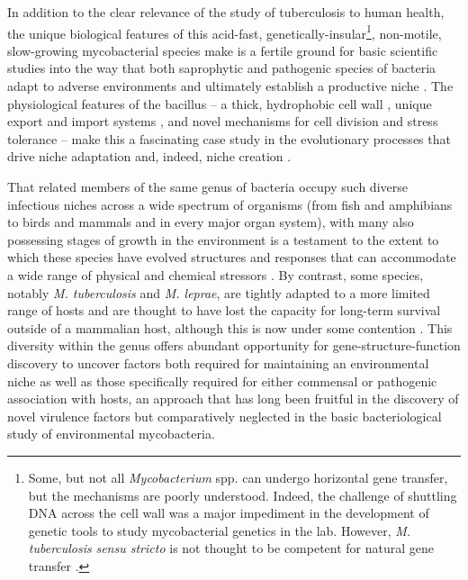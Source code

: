 In addition to the clear relevance of the study of tuberculosis to human health, the unique biological features of this acid\hyp{}fast, genetically\hyp{}insular\footnote{Some, but not all \textit{Mycobacterium} spp. can undergo horizontal gene transfer, but the mechanisms are poorly understood. Indeed, the challenge of shuttling DNA across the cell wall was a major impediment in the development of genetic tools to study mycobacterial genetics in the lab. However, \textit{M. tuberculosis} \textit{sensu stricto} is not thought to be competent for natural gene transfer \citep{Madacki2021, Reva2015, Merker2015, Galagan2014, Boritsch2016, Derbyshire2014, Krzywinska2004}.}, non\hyp{}motile, slow\hyp{}growing mycobacterial species make is a fertile ground for basic scientific studies into the way that both saprophytic and pathogenic species of bacteria adapt to adverse environments and ultimately establish a productive niche \citep{Prasanthi2014, Falkinham2009, Ghodbane2014, Houben2006, Pieters2002, Delafont2014}. The physiological features of the bacillus -- a thick, hydrophobic cell wall \citep{Chatterjee1997, Jarlier1994, Jankute2015}, unique export and import systems \citep{Houben2014, Bunduc2020, Famelis2019, Pandey2008, Tullius2011, Braibant2000, Wong2017a}, and novel mechanisms for cell division \citep{Hett2008, Odermatt2020, Dziadek2003, Kieser2014} and stress tolerance \citep{Garg2015, Peddireddy2017} -- make this a fascinating case study in the evolutionary processes that drive niche adaptation and, indeed, niche creation \citep{Lovewell2021, Honda2018, Lerner2016, Gengenbacher2012, Sarathy2020, Warner2007, Chapman1971, deChastellier2009, Gagneux2018, Pereira2020}. 

That related members of the same genus of bacteria occupy such diverse infectious niches across a wide spectrum of organisms (from fish and amphibians to birds and mammals and in every major organ system), with many also possessing stages of growth in the environment is a testament to the extent to which these species have evolved structures and responses that can accommodate a wide range of physical and chemical stressors \citep{Thoen1981, Palmer2011, Hershberg2016, Saelens2019, Larsen2020}. By contrast, some species, notably \textit{M. tuberculosis} and \textit{M. leprae}, are tightly adapted to a more limited range of hosts and are thought to have lost the capacity for long\hyp{}term survival outside of a mammalian host, although this is now under some contention \citep{Ploemacher2020, Borham2022, Martinez2019, Mtetwa2022}. This diversity within the genus offers abundant opportunity for gene\hyp{}structure\hyp{}function discovery to uncover factors both required for maintaining an environmental niche as well as those specifically required for either commensal or pathogenic association with hosts, an approach that has long been fruitful in the discovery of novel virulence factors \citep{Sassetti2003, Ehrt2015} but comparatively neglected in the basic bacteriological study of environmental mycobacteria.

